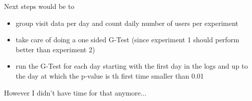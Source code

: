 \documentclass{article}\usepackage[]{graphicx}\usepackage[]{color}
\begin{document}
Next steps would be to 
\begin{itemize}
  \item group visit data per day and count daily number of users per experiment
  \item take care of doing a one sided G-Test (since experiment 1 should perform better than experiment 2)
  \item run the G-Test for each day starting with the first day in the logs and up to the day at which the p-value is th first time smaller than 0.01
\end{itemize}

However I didn't have time for that anymore...
\end{document}
